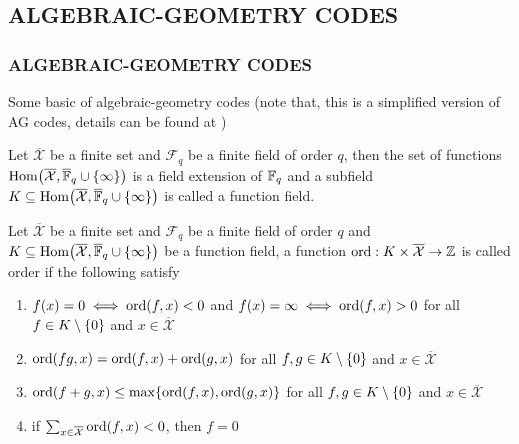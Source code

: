 \documentclass{article}
\begin{document}
\subsection{ALGEBRAIC-GEOMETRY CODES}

\subsubsection{ALGEBRAIC-GEOMETRY CODES}

Some basic of algebraic-geometry codes (note that, this is a simplified version of AG codes, details can be found at \cite{stichtenoth2009algebraic})

\begin{definition}
    Let $\overline{\mathcal{X}}$ be a finite set and $\mathcal{F}_q$ be a finite field of order $q$, then the set of functions $\Hom\tuple*{ \overline{\mathcal{X}}, \overline{\F}_q \cup \set{\infty} }$ is a field extension of $\mathbb{F}_q$ and a subfield $K \subseteq \Hom\tuple*{ \overline{\mathcal{X}}, \overline{\F}_q \cup \set{\infty} }$ is called a function field.
\end{definition}

\begin{definition}
    Let $\overline{\mathcal{X}}$ be a finite set and $\mathcal{F}_q$ be a finite field of order $q$ and $K \subseteq \Hom\tuple*{ \overline{\mathcal{X}}, \overline{\F}_q \cup \set{\infty} }$ be a function field, a function $\operatorname{ord}: K \times \overline{\mathcal{X}} \to \mathbb{Z}$ is called order if the following satisfy
    \begin{enumerate}
        \item $f(x) = 0 \iff \operatorname{ord}(f, x) < 0$ and $f(x) = \infty \iff \operatorname{ord}(f, x) > 0$ for all $f \in K \setminus \{0\}$ and $x \in \overline{\mathcal{X}}$

        \item $\operatorname{ord}(fg, x) = \operatorname{ord}(f, x) + \operatorname{ord}(g, x)$ for all $f, g \in K \setminus \{0\}$ and $x \in \overline{\mathcal{X}}$

        \item $\operatorname{ord}(f + g, x) \leq \max\{\operatorname{ord}(f, x), \operatorname{ord}(g, x)\}$ for all $f, g \in K \setminus \{0\}$ and $x \in \overline{\mathcal{X}}$

        \item if $\sum_{x \in \overline{\mathcal{X}}} \operatorname{ord}(f, x) < 0$, then $f = 0$
    \end{enumerate}
\end{definition}
\end{document}
